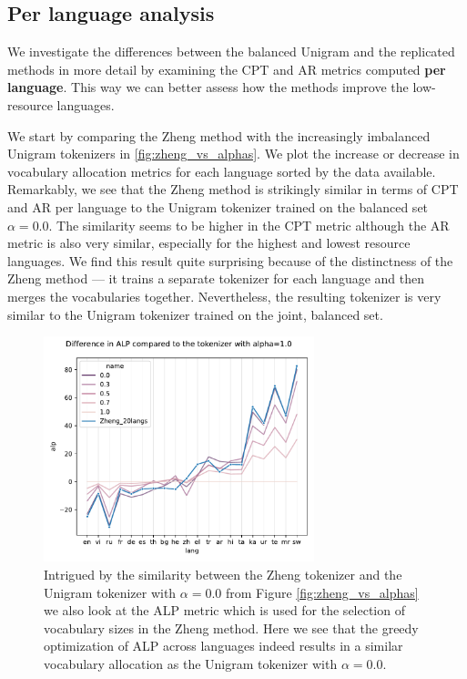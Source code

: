\subsection{Per language analysis}

We investigate the differences between the balanced Unigram and the replicated methods in more detail by examining the CPT and AR metrics computed \textbf{per language}. This way we can better assess how the methods improve the low-resource languages.

We start by comparing the Zheng method with the increasingly imbalanced Unigram tokenizers in \autoref{fig:zheng_vs_alphas}. We plot the increase or decrease in vocabulary allocation metrics for each language sorted by the data available. Remarkably, we see that the Zheng method is strikingly similar in terms of CPT and AR per language to the Unigram tokenizer trained on the balanced set $\alpha=0.0$. The similarity seems to be higher in the CPT metric although the AR metric is also very similar, especially for the highest and lowest resource languages. We find this result quite surprising because of the distinctness of the Zheng method --- it trains a separate tokenizer for each language and then merges the vocabularies together. Nevertheless, the resulting tokenizer is very similar to the Unigram tokenizer trained on the joint, balanced set. 


\begin{figure}[H]
    \centering
    \includegraphics[width=0.7\textwidth]{figures/zheng_vs_alphas_alp.pdf}
    \caption{Intrigued by the similarity between the Zheng tokenizer and the Unigram tokenizer with $\alpha=0.0$ from Figure \ref{fig:zheng_vs_alphas} we also look at the ALP metric which is used for the selection of vocabulary sizes in the Zheng method. Here we see that the greedy optimization of ALP across languages indeed results in a similar vocabulary allocation as the Unigram tokenizer with $\alpha=0.0$.}
    \label{fig:zheng_vs_alphas_alp}
\end{figure}

